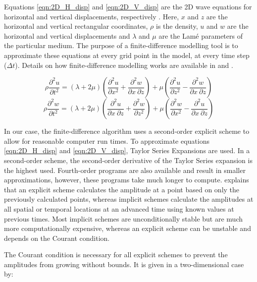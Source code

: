 \documentclass[12pt]{article}
\begin{document}
	Equations \eqref{eqn:2D_H_disp} and \eqref{eqn:2D_V_disp} are the 2D wave equations for horizontal and vertical displacements, respectively \citep{levander1988}. Here, $x$ and $z$ are the horizontal and vertical rectangular coordinates, $\rho$ is the density, $u$ and $w$ are the horizontal and vertical displacements and $\lambda$ and $\mu$ are the Lam\'e  parameters of the particular medium. The purpose of a finite-difference modelling tool is to approximate these equations at every grid point in the model, at every time step ($\Delta t$). Details on how finite-difference modelling works are available in \cite{kelly1976} and \cite{levander1988}.
	
\begin{equation}
	\label{eqn:2D_H_disp}
	\rho \frac{\partial^2 u}{\partial t^2}=(\lambda+2\mu)(\frac{\partial^2 u}{\partial x^2}+\frac{\partial^2 w}{\partial x\:\partial z})+\mu(\frac{\partial^2 u}{\partial z^2}-\frac{\partial^2 w}{\partial x\:\partial z})
\end{equation}
\begin{equation}
	\label{eqn:2D_V_disp}
	\rho \frac{\partial^2 w}{\partial t^2}=(\lambda+2\mu)(\frac{\partial^2 u}{\partial x\:\partial z}+\frac{\partial^2 w}{\partial z^2})+\mu(\frac{\partial^2 w}{\partial x^2}-\frac{\partial^2 u}{\partial x\:\partial z})
\end{equation}

	
	In our case, the finite-difference algorithm uses a second-order explicit scheme to allow for reasonable computer run times. To approximate equations \ref{eqn:2D_H_disp} and \ref{eqn:2D_V_disp}, Taylor Series Expansions are used. In a second-order scheme, the second-order derivative of the Taylor Series expansion is the highest used. Fourth-order programs are also available and result in smaller approximations, however, these programs take much longer to compute. \cite{levander1988} explains that an explicit scheme calculates the amplitude at a point based on only the previously calculated points, whereas implicit schemes calculate the amplitudes at all spatial or temporal locations at an advanced time using known values at previous times. Most implicit schemes are unconditionally stable but are much more computationally expensive, whereas an explicit scheme can be unstable and depends on the Courant condition.
	
	The Courant condition is necessary for all explicit schemes to prevent the amplitudes from growing without bounds. It is given in a two-dimensional case by:
\end{document}
